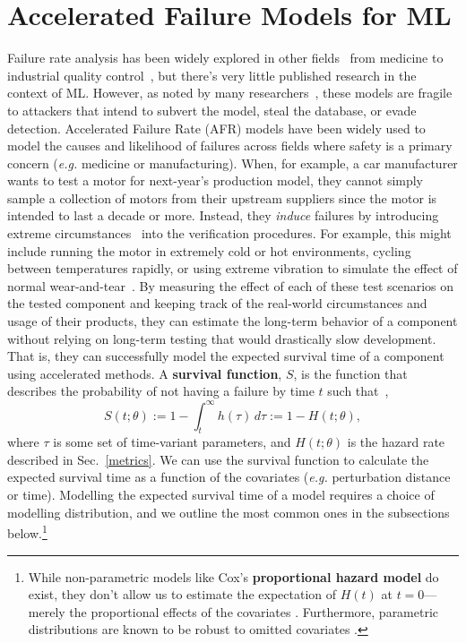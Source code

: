 \label{afr_models}
\section{Accelerated Failure Models for ML}
Failure rate analysis has been widely explored in other fields~\citep{aft_models} from medicine to industrial quality control~\citep{ai_medical_imaging,ai_industry,ai_aviation,ai_luggage,ai_security,ai_prison}, but there's very little published research in the context of ML. However, as noted by many researchers~\citep{madry2017towards, carlini_towards_2017, croce_reliable_2020, meyers}, these models are fragile to attackers that intend to subvert the model, steal the database, or evade detection.  Accelerated Failure Rate (AFR) models have been widely used to model the causes and likelihood of failures across fields where safety is a primary concern (\textit{e.g.} medicine or manufacturing). When, for example, a car manufacturer wants to test a motor for next-year's production model, they cannot simply sample a collection of motors from their upstream suppliers since the motor is intended to last a decade or more. Instead, they \textit{induce} failures by introducing extreme circumstances~\citep{liu2013development,lawless1995methods} into the verification procedures. For example, this might include running the motor in extremely cold or hot environments, cycling between temperatures rapidly, or using extreme vibration to simulate the effect of normal wear-and-tear~\citep{meeker1998accelerated}. By measuring the effect of each of these test scenarios on the tested component and keeping track of the real-world circumstances and usage of their products, they can estimate the long-term behavior of a component without relying on long-term testing that would drastically slow development. That is, they can successfully model the expected survival time of a component using accelerated methods. A \textbf{survival function}, $S$, is the function that describes the probability of not having a failure by time $t$ such that~\cite{kleinbaum1996survival},
\[
    S(t; \theta):= 1- \int_t^{\infty} h(\tau) \,d\tau := 1 - H(t; \theta),
\]
where $\tau$ is some set of time-variant parameters, and $H(t; \theta)$ is the hazard rate described in Sec.~\ref{metrics}. We can use the survival function to calculate the expected survival time as a function of the covariates (\textit{e.g.} perturbation distance or time). Modelling the expected survival time of a model requires a choice of modelling distribution, and we outline the most common ones in the subsections below.\footnote{While non-parametric models like Cox's \textbf{proportional hazard model} do exist, they don't allow us to estimate the expectation of $H(t)$ at $t=0$---merely the proportional effects of the covariates \citep{aft_models}. Furthermore, parametric distributions are known to be robust to omitted covariates \citep{lambert2004parametric}.} 

